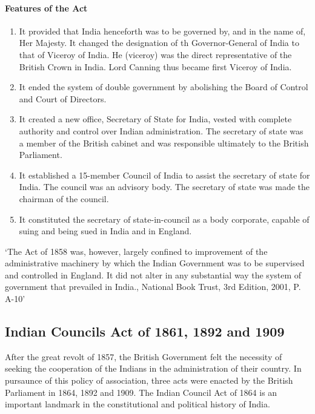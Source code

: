 \begin{multicols}{2}
\paragraph{Features of the Act}
\begin{enumerate}
  \item It provided that India henceforth was to be governed by, and in the name of, Her Majesty. It changed the designation of th Governor-General of India to that of Viceroy of India. He (viceroy) was the direct representative of the British Crown in India. Lord Canning thus became first Viceroy of India.
  \item It ended the system of double government by abolishing the Board of Control and Court of Directors.
  \item It created a new office, Secretary of State for India, vested with complete authority and control over Indian administration. The secretary of state was a member of the British cabinet and was responsible ultimately to the British Parliament.
  \item It established a 15-member Council of India to assist the secretary of state for India. The council was an advisory body. The secretary of state was made the chairman of the council.
  \item It constituted the secretary of state-in-council as a body corporate, capable of suing and being sued in India and in England.
\end{enumerate}

`The Act of 1858 was, however, largely confined to improvement of the administrative machinery by which the Indian Government was to be supervised and controlled in England. It did not alter in any substantial way the system of government that prevailed in India.\endnote, National Book Trust, 3rd Edition, 2001, P. A-10'


\subsection{Indian Councils Act of 1861, 1892 and 1909}
After the great revolt of 1857, the British Government felt the necessity of seeking the cooperation of the Indians in the administration of their country. In pursaunce of this policy of association, three acts were enacted by the British Parliament in 1864, 1892 and 1909. The Indian Council Act of 1864 is an important landmark in the constitutional and political history of India.


\end{multicols}
